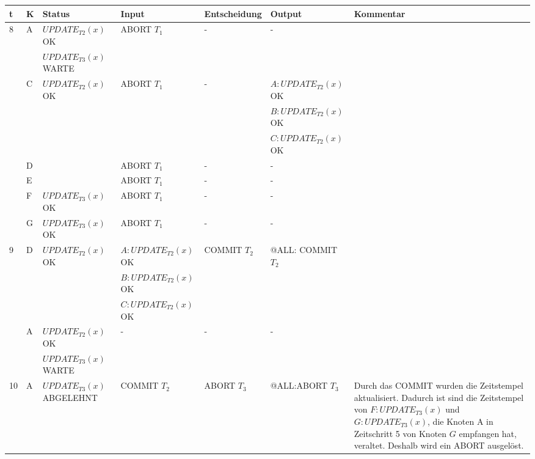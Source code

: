 \documentclass[a4paper, landscape]{article}
\begin{document}
\begin{tabular}{| l | l | l | l | l | l | p{6cm} |}
\hline
t & K & Status & Input & Entscheidung & Output & Kommentar \\
\hline
\hline

8 & \multirow{2}{*}{A} 
			&   $UPDATE_{T2}(x)$ OK 		&   ABORT $T_1$ 	& - &	 -  &\\
			&& $UPDATE_{T3}(x)$ WARTE   &   &   &	   &  \\
\cline{2-7}
& \multirow{3}{*}{C} 
			& $UPDATE_{T2}(x)$ OK   &  ABORT $T_1$  & -  &	 $A: UPDATE_{T2}(x)$ OK  &  \\
			&& 																		  & 									 &  &	 $B: UPDATE_{T2}(x)$ OK  &  \\
			&& 																		  & 									 &  &	 $C: UPDATE_{T2}(x)$ OK  &  \\
\cline{2-7}
& D & & ABORT $T_1$& - & - &\\
\cline{2-7}
& E & & ABORT $T_1$& - & - &\\
\cline{2-7}
& F &	$UPDATE_{T3}(x)$ OK 					 & ABORT $T_1$	& - & -&\\
\cline{2-7}
& G &	$UPDATE_{T3}(x)$ OK 					 & ABORT $T_1$	& - & -&\\
\hline
\hline

9 & \multirow{2}{*}{D} 
			&   $UPDATE_{T2}(x)$ OK & $A: UPDATE_{T2}(x)$ OK 		  	& COMMIT $T_2$ &	@ALL: COMMIT $T_2$  &\\
			&& 																& $B: UPDATE_{T2}(x)$ OK      &   &	   &  \\
			&&																	& $C: UPDATE_{T2}(x)$ OK      &   &	   &  \\
\cline{2-7}
& \multirow{2}{*}{A} 
			&   $UPDATE_{T2}(x)$ OK 		&   -	& - &	 -  &\\
			&& $UPDATE_{T3}(x)$ WARTE   &   &   &	   &  \\
\hline
\hline


10 & A & $UPDATE_{T3}(x)$ ABGELEHNT   &  COMMIT $T_2$ &  ABORT $T_3$ &	 @ALL:ABORT $T_3$ &  Durch das COMMIT wurden die Zeitstempel aktualisiert. Dadurch ist sind die Zeitstempel von $F: UPDATE_{T3}(x)$ und $G: UPDATE_{T3}(x)$, die Knoten A in Zeitschritt 5 von Knoten $G$ empfangen hat, veraltet. Deshalb wird ein ABORT ausgelöst.\\
\hline

					
\end{tabular}
\end{document}
